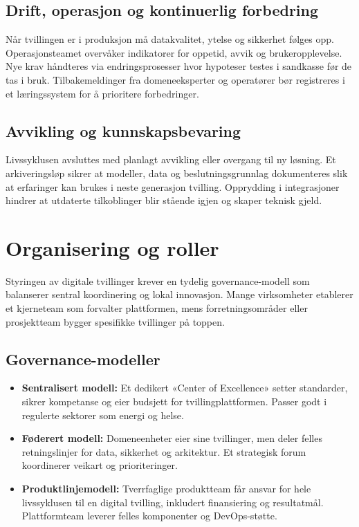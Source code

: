 \subsection*{Drift, operasjon og kontinuerlig forbedring}
Når tvillingen er i produksjon må datakvalitet, ytelse og sikkerhet følges opp. Operasjonsteamet overvåker indikatorer for oppetid, avvik og brukeropplevelse. Nye krav håndteres via endringsprosesser hvor hypoteser testes i sandkasse før de tas i bruk. Tilbakemeldinger fra domeneeksperter og operatører bør registreres i et læringssystem for å prioritere forbedringer.

\subsection*{Avvikling og kunnskapsbevaring}
Livssyklusen avsluttes med planlagt avvikling eller overgang til ny løsning. Et arkiveringsløp sikrer at modeller, data og beslutningsgrunnlag dokumenteres slik at erfaringer kan brukes i neste generasjon tvilling. Opprydding i integrasjoner hindrer at utdaterte tilkoblinger blir stående igjen og skaper teknisk gjeld.

\section{Organisering og roller}
Styringen av digitale tvillinger krever en tydelig governance-modell som balanserer sentral koordinering og lokal innovasjon. Mange virksomheter etablerer et kjerneteam som forvalter plattformen, mens forretningsområder eller prosjektteam bygger spesifikke tvillinger på toppen.

\subsection*{Governance-modeller}
\begin{itemize}
    \item \textbf{Sentralisert modell:} Et dedikert «Center of Excellence» setter standarder, sikrer kompetanse og eier budsjett for tvillingplattformen. Passer godt i regulerte sektorer som energi og helse.
    \item \textbf{Føderert modell:} Domeneenheter eier sine tvillinger, men deler felles retningslinjer for data, sikkerhet og arkitektur. Et strategisk forum koordinerer veikart og prioriteringer.
    \item \textbf{Produktlinjemodell:} Tverrfaglige produktteam får ansvar for hele livssyklusen til en digital tvilling, inkludert finansiering og resultatmål. Plattformteam leverer felles komponenter og DevOps-støtte.
\end{itemize}

